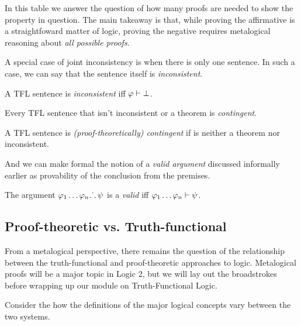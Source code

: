 In this table we answer the question of how many proofs are needed to show the
property in question. The main takeaway is that, while proving the affirmative
is a straightfoward matter of logic, proving the negative requires metalogical
reasoning about \emph{all possible proofs}.

A special case of joint inconsistency is when there is only one sentence. In
such a case, we can say that the sentence itself is \emph{inconsistent}.

\begin{definition}
  \label{def:tfl-inconsistent-sentence}
  A TFL sentence \sphi is \emph{inconsistent} iff $\varphi\vdash\bot$.
\end{definition}

Every TFL sentence that isn't inconsistent or a theorem is \emph{contingent}.

\begin{definition}
  \label{def:tfl-contingent-sentence}
  A TFL sentence \sphi is \emph{(proof-theoretically) contingent} if \sphi is
  neither a theorem nor inconsistent.
\end{definition}

And we can make formal the notion of a \emph{valid argument} discussed
informally earlier as provability of the conclusion from the premises.

\begin{definition}
  \label{def:tfl-joint-consistency}
  The argument $\varphi_1\dots\varphi_n\ldotp\dot{}\,\ldotp\psi$ is a \emph{valid} iff
  $\varphi_1\dots\varphi_n\vdash\psi$.
\end{definition}

\subsection{Proof-theoretic vs. Truth-functional}

From a metalogical perspective, there remains the question of the relationship
between the truth-functional and proof-theoretic approaches to logic.
Metalogical proofs will be a major topic in Logic 2, but we will lay out the
broadstrokes before wrapping up our module on Truth-Functional Logic.

Consider the how the definitions of the major logical concepts vary between
the two systems.

